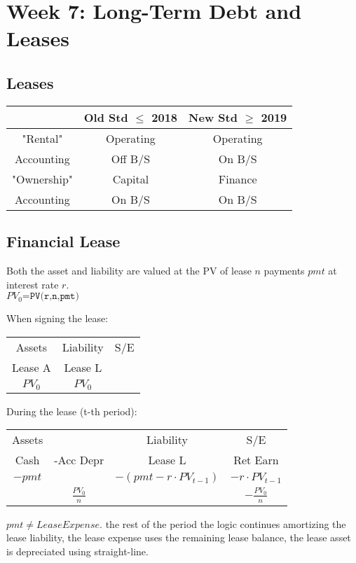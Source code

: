\section*{Week 7: Long-Term Debt and Leases}

\subsection*{Leases}


	\begin{tabular}{ |c|c|c| } 
	\hline
	& Old Std $\leq$ 2018 & New Std $\geq$ 2019 \\ 
	\hline
	"Rental" & Operating & Operating \\ 
	Accounting & Off B/S & On B/S \\ 
	\hline
	"Ownership" & Capital & Finance \\ 
	Accounting & On B/S & On B/S \\ 
	\hline
	\end{tabular}

\subsection*{Financial Lease} 

 Both the asset and liability are valued at the PV of lease $n$ payments $pmt$ at interest rate $r$. \\
 $PV_0\texttt{=PV(r,n,pmt)}$ 
 
 When signing the lease:\\
 	\begin{tabular}{ |c||c|c| } 
 	\hline
 	Assets  & Liability  & S/E \\ 
 	Lease A & Lease L  &  \\ 
 	\hline
 	$PV_0$ & $PV_0$  &  \\ 
 	\hline
 \end{tabular}

During the lease (t-th period): \\
 	\begin{tabular}{ |c|c||c|c| } 
	\hline
	Assets  & & Liability  & S/E \\ 
	Cash & -Acc Depr  & Lease L & Ret Earn  \\ 
	\hline
	$-pmt$ & & $-(pmt-r\cdot PV_{t-1})$ &  $-r\cdot PV_{t-1}$ \\
	\hline
	       & $\frac{PV_0}{n}$ &    & $-\frac{PV_0}{n}$  \\
	\hline
\end{tabular} 
$pmt \neq LeaseExpense$. 
the rest of the period the logic continues amortizing the lease liability, the lease expense uses the remaining lease balance, the lease asset is depreciated using straight-line.


